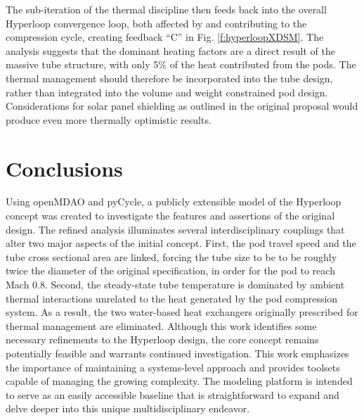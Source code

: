 \documentclass[heading.tex]{subfiles}
\begin{document}
The sub-iteration of the thermal discipline then feeds back into the overall
Hyperloop convergence loop, both affected by and contributing to the
compression cycle, creating feedback “C” in Fig. \ref{f:hyperloopXDSM}.
The analysis suggests that the dominant heating factors are a direct result of
the massive tube structure, with only 5\% of the heat contributed from the pods.
The thermal management should therefore be incorporated into the tube design,
rather than integrated into the volume and weight constrained pod design.
Considerations for solar panel shielding as outlined in the original proposal
would produce even more thermally optimistic results.


\section{Conclusions}

Using openMDAO and pyCycle, a publicly extensible model of the Hyperloop concept was created 
to investigate the features and assertions of the original design. 
The refined analysis illuminates several
interdisciplinary couplings that alter two major aspects of the initial concept.
First, the pod travel speed and the tube cross sectional area are linked, forcing 
the tube size to be to be roughly twice the diameter of the original specification,
in order for the pod to reach Mach 0.8.
Second, the steady-state tube temperature is dominated by ambient thermal interactions
unrelated to the heat generated by the pod compression system. As a result,
the two water-based heat exchangers originally prescribed for thermal management are eliminated.
Although this work identifies some necessary refinements to the Hyperloop design, the core 
concept remains potentially feasible and warrants continued investigation. 
This work emphasizes the importance of maintaining a systems-level approach
and provides toolsets capable of managing the growing complexity.
The modeling platform is intended to serve as an easily accessible baseline that is straightforward to
expand and delve deeper into this unique multidisciplinary endeavor.
\end{document}
